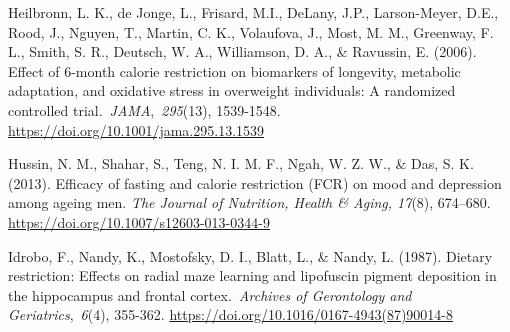 \documentclass[authordate, empirical]{jote-new-article}
\begin{document}
Heilbronn, L. K., de Jonge, L., Frisard, M.I., DeLany, J.P., Larson-Meyer, D.E., Rood, J., Nguyen, T., Martin, C. K., Volaufova, J., Most, M. M., Greenway, F. L., Smith, S. R., Deutsch, W. A., Williamson, D. A., \& Ravussin, E. (2006). Effect of 6-month calorie restriction on biomarkers of longevity, metabolic adaptation, and oxidative stress in overweight individuals: A randomized controlled trial. \emph{JAMA}, \emph{295}(13), 1539-1548. \url{https://doi.org/10.1001/jama.295.13.1539}









Hussin, N. M., Shahar, S., Teng, N. I. M. F., Ngah, W. Z. W., \& Das, S. K. (2013). Efficacy of fasting and calorie restriction (FCR) on mood and depression among ageing men.\emph{ The Journal of Nutrition, Health \& Aging, 17}(8), 674--680. \url{https://doi.org/10.1007/s12603-013-0344-9}



Idrobo, F., Nandy, K., Mostofsky, D. I., Blatt, L., \& Nandy, L. (1987). Dietary restriction: Effects on radial maze learning and lipofuscin pigment deposition in the hippocampus and frontal cortex. \emph{Archives of Gerontology and Geriatrics}, \emph{6}(4), 355-362. \url{https://doi.org/10.1016/0167-4943(87)90014-8}



\end{document}
